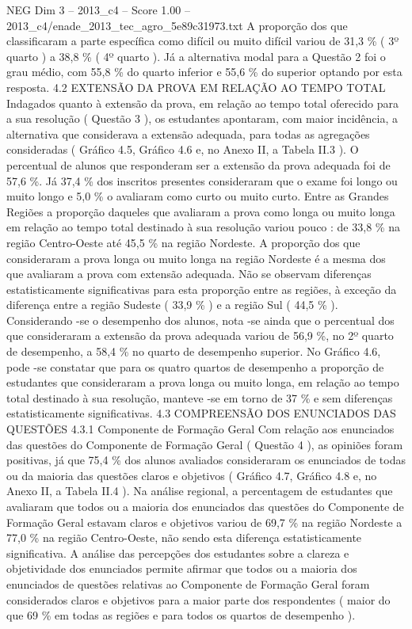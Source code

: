 \begin{textsample}{NEG Dim 3 – 2013\_c4 – Score 1.00 – 2013\_c4/enade\_2013\_tec\_agro\_5e89c31973.txt}
A proporção dos que classificaram a parte específica como difícil ou muito difícil variou de 31,3 \% ( 3º quarto ) a 38,8 \% ( 4º quarto ).
Já a alternativa modal para a Questão 2 foi o grau médio, com 55,8 \% do quarto inferior e 55,6 \% do superior optando por esta resposta. 4.2 EXTENSÃO DA PROVA EM RELAÇÃO AO TEMPO TOTAL Indagados quanto à extensão da prova, em relação ao tempo total oferecido para a sua resolução ( Questão 3 ), os estudantes apontaram, com maior incidência, a alternativa que considerava a extensão adequada, para todas as agregações consideradas ( Gráfico 4.5, Gráfico 4.6 e, no Anexo II, a Tabela II.3 ).
O percentual de alunos que responderam ser a extensão da prova adequada foi de 57,6 \%.
Já 37,4 \% dos inscritos presentes consideraram que o exame foi longo ou muito longo e 5,0 \% o avaliaram como curto ou muito curto.
Entre as Grandes Regiões a proporção daqueles que avaliaram a prova como longa ou muito longa em relação ao tempo total destinado à sua resolução variou pouco : de 33,8 \% na região Centro-Oeste até 45,5 \% na região Nordeste.
A proporção dos que consideraram a prova longa ou muito longa na região Nordeste é a mesma dos que avaliaram a prova com extensão adequada.
Não se observam diferenças estatisticamente significativas para esta proporção entre as regiões, à exceção da diferença entre a região Sudeste ( 33,9 \% ) e a região Sul ( 44,5 \% ).
Considerando -se o desempenho dos alunos, nota -se ainda que o percentual dos que consideraram a extensão da prova adequada variou de 56,9 \%, no 2º quarto de desempenho, a 58,4 \% no quarto de desempenho superior.
No Gráfico 4.6, pode -se constatar que para os quatro quartos de desempenho a proporção de estudantes que consideraram a prova longa ou muito longa, em relação ao tempo total destinado à sua resolução, manteve -se em torno de 37 \% e sem diferenças estatisticamente significativas. 4.3 COMPREENSÃO DOS ENUNCIADOS DAS QUESTÕES 4.3.1 Componente de Formação Geral Com relação aos enunciados das questões do Componente de Formação Geral ( Questão 4 ), as opiniões foram positivas, já que 75,4 \% dos alunos avaliados consideraram os enunciados de todas ou da maioria das questões claros e objetivos ( Gráfico 4.7, Gráfico 4.8 e, no Anexo II, a Tabela II.4 ).
Na análise regional, a percentagem de estudantes que avaliaram que todos ou a maioria dos enunciados das questões do Componente de Formação Geral estavam claros e objetivos variou de 69,7 \% na região Nordeste a 77,0 \% na região Centro-Oeste, não sendo esta diferença estatisticamente significativa.
A análise das percepções dos estudantes sobre a clareza e objetividade dos enunciados permite afirmar que todos ou a maioria dos enunciados de questões relativas ao Componente de Formação Geral foram considerados claros e objetivos para a maior parte dos respondentes ( maior do que 69 \% em todas as regiões e para todos os quartos de desempenho ).

\end{textsample}
